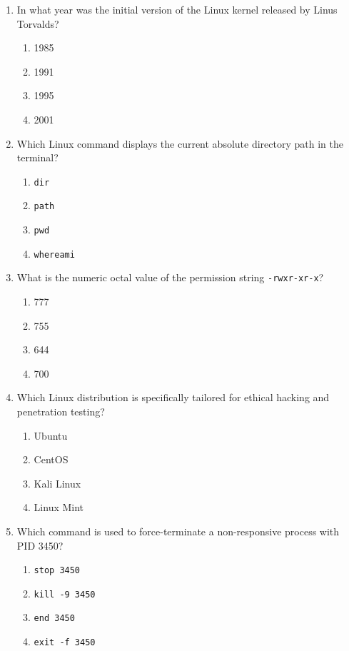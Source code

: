 \begin{enumerate}[leftmargin=1.5em]
    \item In what year was the initial version of the Linux kernel released by Linus Torvalds?
    \begin{enumerate}[label=(\alph*)]
        \item 1985
        \item 1991
        \item 1995
        \item 2001
    \end{enumerate}

    \item Which Linux command displays the current absolute directory path in the terminal?
    \begin{enumerate}[label=(\alph*)]
        \item \texttt{dir}
        \item \texttt{path}
        \item \texttt{pwd}
        \item \texttt{whereami}
    \end{enumerate}

    \item What is the numeric octal value of the permission string \texttt{-rwxr-xr-x}?
    \begin{enumerate}[label=(\alph*)]
        \item 777
        \item 755
        \item 644
        \item 700
    \end{enumerate}

    \item Which Linux distribution is specifically tailored for ethical hacking and penetration testing?
    \begin{enumerate}[label=(\alph*)]
        \item Ubuntu
        \item CentOS
        \item Kali Linux
        \item Linux Mint
    \end{enumerate}

    \item Which command is used to force-terminate a non-responsive process with PID 3450?
    \begin{enumerate}[label=(\alph*)]
        \item \texttt{stop 3450}
        \item \texttt{kill -9 3450}
        \item \texttt{end 3450}
        \item \texttt{exit -f 3450}
    \end{enumerate}


\end{enumerate}
